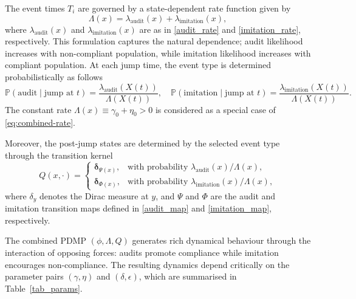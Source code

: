 \documentclass[11pt]{article}
\theoremstyle{plain}
\theoremstyle{definition}
\newcommand{\1}{\mathbf{1}}
\begin{document}
The event times $T_i$ are governed by a state-dependent rate function given by
\begin{equation}
\label{eq:combined-rate}
    \Lambda(x) = \lambda_{\text{audit}}(x) + \lambda_{\text{imitation}}(x),
\end{equation}
where $\lambda_{\text{audit}}(x)$ and $\lambda_{\text{imitation}}(x)$ are as in \eqref{audit_rate} and \eqref{imitation_rate}, respectively.
This formulation captures the natural dependence; audit likelihood increases with non-compliant population, while imitation likelihood increases with compliant population. At each jump time, the event type is determined probabilistically as follows
\begin{equation*}
\mathbb{P}(\text{audit} \mid \text{jump at } t) = \frac{\lambda_{\text{audit}}(X(t))}{\Lambda(X(t))}, \quad 
\mathbb{P}(\text{imitation} \mid \text{jump at } t) = \frac{\lambda_{\text{imitation}}(X(t))}{\Lambda(X(t))}.
\end{equation*}
The constant rate $\Lambda(x)\equiv \gamma_0+\eta_0>0$ is considered as a special case of \eqref{eq:combined-rate}.

Moreover, the post-jump states are determined by the selected event type through the transition kernel
\begin{equation}\label{combined_kernel}
Q(x, \cdot) = 
\begin{cases}
\boldsymbol{\delta}_{\Psi(x)}, & \text{with probability } \lambda_{\mathrm{audit}}(x)/\Lambda(x), \\
\boldsymbol{\delta}_{\Phi(x)}, & \text{with probability } \lambda_{\mathrm{imitation}}(x)/\Lambda(x),
\end{cases}    
\end{equation}
where $\delta_y$ denotes the Dirac measure at $y$, and $\Psi$ and $\Phi$ are the audit and imitation transition maps defined in \eqref{audit_map} and \eqref{imitation_map}, respectively.

The combined PDMP $(\phi, \Lambda, Q)$ generates rich dynamical behaviour through the interaction of opposing forces: audits promote compliance while imitation encourages non-compliance. The resulting dynamics depend critically on the parameter pairs $(\gamma, \eta)$ and $(\delta, \epsilon)$, which are summarised in Table~\ref{tab_params}. %
\end{document}
